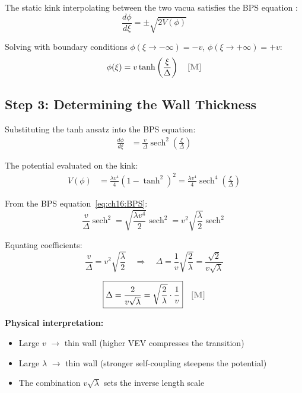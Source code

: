 The static kink interpolating between the two vacua satisfies the BPS equation
\tagM{}:
\begin{equation}
    \frac{d\phi}{d\xi} = \pm \sqrt{2 V(\phi)}
    \label{eq:ch16:BPS}
\end{equation}

Solving with boundary conditions $\phi(\xi \to -\infty) = -v$,
$\phi(\xi \to +\infty) = +v$:
\begin{equation}
    \phi(\xi) = v \tanh\left(\frac{\xi}{\Delta}\right)
    \quad \tagM{}
    \label{eq:ch16:kink_profile}
\end{equation}

\subsection{Step 3: Determining the Wall Thickness}
\label{subsec:ch16_thickness}

Substituting the tanh ansatz into the BPS equation:
\begin{align}
    \frac{d\phi}{d\xi} &= \frac{v}{\Delta} \operatorname{sech}^2\left(\frac{\xi}{\Delta}\right)
    \label{eq:ch16:dphi}
\end{align}

The potential evaluated on the kink:
\begin{align}
    V(\phi) &= \frac{\lambda v^4}{4} \left(1 - \tanh^2\right)^2
    = \frac{\lambda v^4}{4} \operatorname{sech}^4\left(\frac{\xi}{\Delta}\right)
    \label{eq:ch16:Vkink}
\end{align}

From the BPS equation~\eqref{eq:ch16:BPS}:
\begin{equation}
    \frac{v}{\Delta} \operatorname{sech}^2 = \sqrt{\frac{\lambda v^4}{2}} \operatorname{sech}^2
    = v^2 \sqrt{\frac{\lambda}{2}} \operatorname{sech}^2
\end{equation}

Equating coefficients:
\begin{equation}
    \frac{v}{\Delta} = v^2 \sqrt{\frac{\lambda}{2}}
    \quad \Rightarrow \quad
    \Delta = \frac{1}{v} \sqrt{\frac{2}{\lambda}} = \frac{\sqrt{2}}{v\sqrt{\lambda}}
\end{equation}

\begin{tcolorbox}[colback=blue!5!white, colframe=blue!50!black,
    title=\textbf{Result: Wall Thickness}]
\begin{equation}
    \boxed{\Delta = \frac{2}{v\sqrt{\lambda}} = \sqrt{\frac{2}{\lambda}} \cdot \frac{1}{v}}
    \quad \tagM{}
    \label{eq:ch16:Delta_result}
\end{equation}

\textbf{Physical interpretation:}
\begin{itemize}[nosep]
    \item Large $v$ $\to$ thin wall (higher VEV compresses the transition)
    \item Large $\lambda$ $\to$ thin wall (stronger self-coupling steepens the potential)
    \item The combination $v\sqrt{\lambda}$ sets the inverse length scale
\end{itemize}
\end{tcolorbox}

